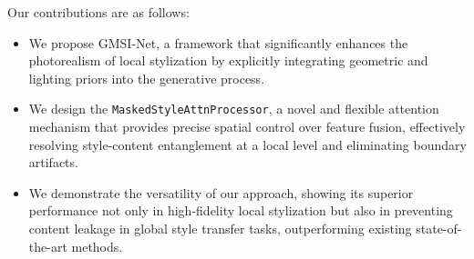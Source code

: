 Our contributions are as follows:
\begin{itemize}
    \item We propose GMSI-Net, a framework that significantly enhances the photorealism of local stylization by explicitly integrating geometric and lighting priors into the generative process.
    \item We design the \texttt{MaskedStyleAttnProcessor}, a novel and flexible attention mechanism that provides precise spatial control over feature fusion, effectively resolving style-content entanglement at a local level and eliminating boundary artifacts.
    \item We demonstrate the versatility of our approach, showing its superior performance not only in high-fidelity local stylization but also in preventing content leakage in global style transfer tasks, outperforming existing state-of-the-art methods.
\end{itemize}
